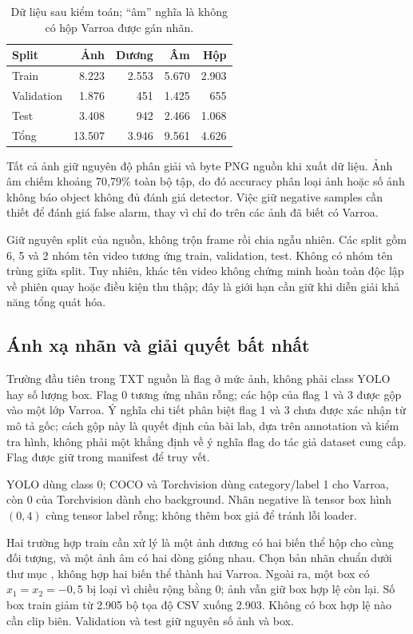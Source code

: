 \documentclass[a4paper,10pt,twocolumn]{article}
\begin{document}
\begin{table}[t]
\centering\small
\caption{Dữ liệu sau kiểm toán; ``âm'' nghĩa là không có hộp Varroa được gán nhãn.}
\label{tab:data}
\begin{tabular}{lrrrr}
\toprule
Split & Ảnh & Dương & Âm & Hộp \\
\midrule
Train & 8.223 & 2.553 & 5.670 & 2.903 \\
Validation & 1.876 & 451 & 1.425 & 655 \\
Test & 3.408 & 942 & 2.466 & 1.068 \\
\midrule
Tổng & 13.507 & 3.946 & 9.561 & 4.626 \\
\bottomrule
\end{tabular}
\end{table}

Tất cả ảnh giữ nguyên độ phân giải và byte PNG nguồn khi xuất dữ liệu.
Ảnh âm chiếm khoảng 70,79\% toàn bộ tập, do đó accuracy phân loại ảnh hoặc số ảnh
không báo object không đủ đánh giá detector. Việc giữ negative samples cần thiết để
đánh giá false alarm, thay vì chỉ đo trên các ảnh đã biết có Varroa.

Giữ nguyên split của nguồn, không trộn frame rồi chia ngẫu nhiên. Các split gồm
6, 5 và 2 nhóm tên video tương ứng train, validation, test. Không có nhóm tên trùng
giữa split. Tuy nhiên, khác tên video không chứng minh hoàn toàn độc lập về phiên quay
hoặc điều kiện thu thập; đây là giới hạn cần giữ khi diễn giải khả năng tổng quát hóa.

\subsection{Ánh xạ nhãn và giải quyết bất nhất}
Trường đầu tiên trong TXT nguồn là flag ở mức ảnh, không phải class YOLO hay số lượng
box. Flag 0 tương ứng nhãn rỗng; các hộp của flag 1 và 3 được gộp vào một lớp Varroa.
Ý nghĩa chi tiết phân biệt flag 1 và 3 chưa được xác nhận từ mô tả gốc; cách gộp này
là quyết định của bài lab, dựa trên annotation và kiểm tra hình, không phải một khẳng
định về ý nghĩa flag do tác giả dataset cung cấp. Flag được giữ trong manifest để truy vết.

YOLO dùng class 0; COCO và Torchvision dùng category/label 1 cho Varroa, còn 0 của
Torchvision dành cho background. Nhãn negative là tensor box hình $(0,4)$ cùng tensor
label rỗng; không thêm box giả để tránh lỗi loader.

Hai trường hợp train cần xử lý là một ảnh dương có hai biến thể hộp cho cùng đối tượng,
và một ảnh âm có hai dòng giống nhau. Chọn bản nhãn chuẩn dưới thư mục
, không hợp hai biến thể thành hai Varroa. Ngoài ra, một box có
$x_1=x_2=-0,5$ bị loại vì chiều rộng bằng 0; ảnh vẫn giữ box hợp lệ còn lại.
Số box train giảm từ 2.905 bộ tọa độ CSV xuống 2.903. Không có box hợp lệ nào cần
clip biên. Validation và test giữ nguyên số ảnh và box.
\end{document}
